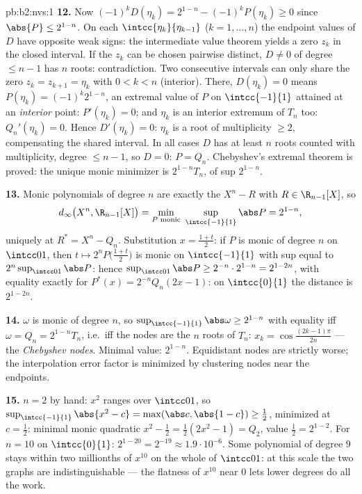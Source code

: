 \begin{solution}{pb:b2:nvs:1}
\textbf{12.} Now $(-1)^kD(\eta_k) = 2^{1-n} - (-1)^kP(\eta_k)
\geq 0$ since $\abs{P} \leq 2^{1-n}$. On each
$\intcc{\eta_k}{\eta_{k-1}}$ ($k = 1, \dots, n$) the endpoint
values of $D$ have opposite weak signs: the intermediate value
theorem yields a zero $z_k$ in the closed interval. If the $z_k$
can be chosen pairwise distinct, $D \neq 0$ of degree $\leq n-1$
has $n$ roots: contradiction. Two consecutive intervals can only
share the zero $z_k = z_{k+1} = \eta_k$ with $0 < k < n$
(interior). There, $D(\eta_k) = 0$ means $P(\eta_k) =
(-1)^k2^{1-n}$, an extremal value of $P$ on $\intcc{-1}{1}$
attained at an \emph{interior} point: $P'(\eta_k) = 0$; and
$\eta_k$ is an interior extremum of $T_n$ too: $Q_n'(\eta_k) =
0$. Hence $D'(\eta_k) = 0$: $\eta_k$ is a root of multiplicity
$\geq 2$, compensating the shared interval. In all cases $D$ has
at least $n$ roots counted with multiplicity, degree $\leq n -
1$, so $D = 0$: $P = Q_n$. Chebyshev's extremal theorem is
proved: the unique monic minimizer is $2^{1-n}T_n$, of sup 
$2^{1-n}$.

\textbf{13.} Monic polynomials of degree $n$ are exactly the
$X^n - R$ with $R \in \R_{n-1}[X]$, so
\[
d_\infty\bigl(X^n, \R_{n-1}[X]\bigr) = \min_{P \text{
monic}}\ \sup_{\intcc{-1}{1}}\abs P = 2^{1-n},
\]
uniquely at $R^* = X^n - Q_n$. Substitution $x = \frac{1+t}2$:
if $P$ is monic of degree $n$ on $\intcc01$, then $t \mapsto
2^nP\bigl(\frac{1+t}2\bigr)$ is monic on $\intcc{-1}{1}$ with
sup equal to $2^n\sup_{\intcc01}\abs P$: hence
$\sup_{\intcc01}\abs P \geq 2^{-n}\cdot2^{1-n} = 2^{1-2n}$, with
equality exactly for $P^*(x) = 2^{-n}Q_n(2x - 1)$: on
$\intcc{0}{1}$ the distance is $2^{1-2n}$.

\textbf{14.} $\omega$ is monic of degree $n$, so
$\sup_{\intcc{-1}{1}}\abs\omega \geq 2^{1-n}$ with equality iff
$\omega = Q_n = 2^{1-n}T_n$, i.e.\ iff the nodes are the $n$
roots of $T_n$: $x_k = \cos\frac{(2k-1)\pi}{2n}$ --- the
\emph{Chebyshev nodes}. Minimal value: $2^{1-n}$. Equidistant
nodes are strictly worse; the interpolation error factor is
minimized by clustering nodes near the endpoints.

\textbf{15.} $n = 2$ by hand: $x^2$ ranges over $\intcc01$, so
$\sup_{\intcc{-1}{1}}\abs{x^2 - c} = \max(\abs c, \abs{1 - c})
\geq \frac12$, minimized at $c = \frac12$: minimal monic
quadratic $x^2 - \frac12 = \frac12(2x^2 - 1) = Q_2$, value
$\frac12 = 2^{1-2}$. For $n = 10$ on $\intcc{0}{1}$: $2^{1-20} =
2^{-19} \approx 1.9\cdot10^{-6}$. Some polynomial of degree $9$
stays within two millionths of $x^{10}$ on the whole of
$\intcc01$: at this scale the two graphs are indistinguishable
--- the flatness of $x^{10}$ near $0$ lets lower degrees do all
the work.


\end{solution}
